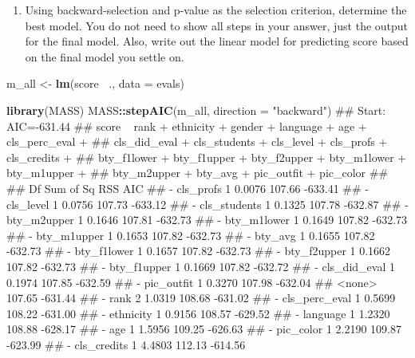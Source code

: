 \documentclass[]{article}
\newenvironment{Shaded}{\begin{snugshade}}{\end{snugshade}}
\newcommand{\KeywordTok}[1]{\textcolor[rgb]{0.13,0.29,0.53}{\textbf{#1}}}
\newcommand{\DataTypeTok}[1]{\textcolor[rgb]{0.13,0.29,0.53}{#1}}
\newcommand{\StringTok}[1]{\textcolor[rgb]{0.31,0.60,0.02}{#1}}
\newcommand{\OperatorTok}[1]{\textcolor[rgb]{0.81,0.36,0.00}{\textbf{#1}}}
\newcommand{\NormalTok}[1]{#1}
\providecommand{\tightlist}{%
  \setlength{\itemsep}{0pt}\setlength{\parskip}{0pt}}
\begin{document}
\begin{enumerate}
\def\labelenumi{\arabic{enumi}.}
\setcounter{enumi}{14}
\tightlist
\item
  Using backward-selection and p-value as the selection criterion,
  determine the best model. You do not need to show all steps in your
  answer, just the output for the final model. Also, write out the
  linear model for predicting score based on the final model you settle
  on.
\end{enumerate}

\begin{Shaded}
\begin{Highlighting}[]
\NormalTok{m_all <-}\StringTok{ }\KeywordTok{lm}\NormalTok{(score }\OperatorTok{~}\NormalTok{., }\DataTypeTok{data =}\NormalTok{ evals)}

\KeywordTok{library}\NormalTok{(MASS)}
\NormalTok{MASS}\OperatorTok{::}\KeywordTok{stepAIC}\NormalTok{(m_all, }\DataTypeTok{direction =} \StringTok{"backward"}\NormalTok{)}
\NormalTok{## Start:  AIC=-631.44}
\NormalTok{## score ~ rank + ethnicity + gender + language + age + cls_perc_eval + }
\NormalTok{##     cls_did_eval + cls_students + cls_level + cls_profs + cls_credits + }
\NormalTok{##     bty_f1lower + bty_f1upper + bty_f2upper + bty_m1lower + bty_m1upper + }
\NormalTok{##     bty_m2upper + bty_avg + pic_outfit + pic_color}
\NormalTok{## }
\NormalTok{##                 Df Sum of Sq    RSS     AIC}
\NormalTok{## - cls_profs      1    0.0076 107.66 -633.41}
\NormalTok{## - cls_level      1    0.0756 107.73 -633.12}
\NormalTok{## - cls_students   1    0.1325 107.78 -632.87}
\NormalTok{## - bty_m2upper    1    0.1646 107.81 -632.73}
\NormalTok{## - bty_m1lower    1    0.1649 107.82 -632.73}
\NormalTok{## - bty_m1upper    1    0.1653 107.82 -632.73}
\NormalTok{## - bty_avg        1    0.1655 107.82 -632.73}
\NormalTok{## - bty_f1lower    1    0.1657 107.82 -632.73}
\NormalTok{## - bty_f2upper    1    0.1662 107.82 -632.73}
\NormalTok{## - bty_f1upper    1    0.1669 107.82 -632.72}
\NormalTok{## - cls_did_eval   1    0.1974 107.85 -632.59}
\NormalTok{## - pic_outfit     1    0.3270 107.98 -632.04}
\NormalTok{## <none>                       107.65 -631.44}
\NormalTok{## - rank           2    1.0319 108.68 -631.02}
\NormalTok{## - cls_perc_eval  1    0.5699 108.22 -631.00}
\NormalTok{## - ethnicity      1    0.9156 108.57 -629.52}
\NormalTok{## - language       1    1.2320 108.88 -628.17}
\NormalTok{## - age            1    1.5956 109.25 -626.63}
\NormalTok{## - pic_color      1    2.2190 109.87 -623.99}
\NormalTok{## - cls_credits    1    4.4803 112.13 -614.56}

\end{Highlighting}
\end{Shaded}
\end{document}
